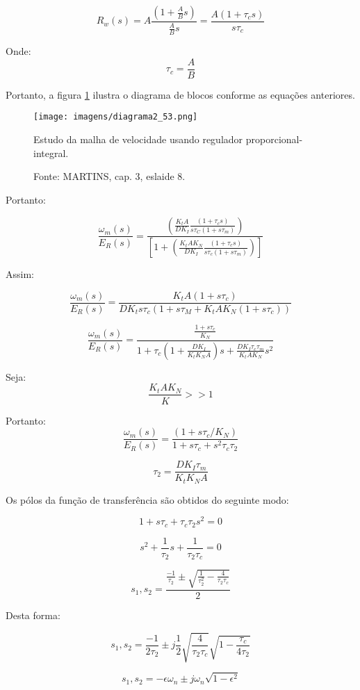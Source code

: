 \[R_{w}(s) = A \frac{\left(1 + \frac{A}{B}s\right)}{\frac{A}{B}s} = \frac{A\left(1 + \tau_{c}s\right)}{s\tau_{c}}\]

Onde:
\[\tau_{c} = \frac{A}{B}\]

Portanto, a figura \ref{fig:D2_53} ilustra o diagrama de blocos conforme as equações anteriores.

\begin{figure}[ht!]
\center
\texttt{[image: imagens/diagrama2\_53.png]}
\caption{\label{fig:D2_53} Estudo da malha de velocidade usando regulador proporcional-integral.}
\caption*{Fonte: MARTINS, cap. 3, eslaide 8.}
\end{figure}

Portanto:

\[\frac{\omega_{m}(s)}{E_{R}(s) } =  \frac{\left(\frac{K_{t}A}{DK_{I}}\frac{\left(1 + \tau_{c}s\right)}{s\tau_{C}\left(1 + s\tau_{m}\right)}\right)}{\left[1 + \left(\frac{K_{t}AK_{N}}{DK_{I}}\frac{\left(1 + \tau_{c}s\right)}{s\tau_{c}\left(1 + s\tau_{m}\right)}\right)\right]}\]

Assim:
 
\[\frac{\omega_{m}(s)}{E_{R}(s) } = \frac{K_{t}A\left(1 + s\tau_{c}\right)}{DK_{t}s\tau_{c}\left(1 + s\tau_{M} + K_{t}AK_{N}\left(1 + s\tau_{c}\right)\right)}\]

\[\frac{\omega_{m}(s)}{E_{R}(s) } = \frac{\frac{1 + s\tau_{c}}{K_{N}}}{1 + \tau_{c}\left(1 + \frac{DK_{I}}{K_{t}K_{N}A}\right)s + \frac{DK_{I}\tau_{c}\tau_{m}}{K_{t}AK_{N}}s^{2} }\]

Seja:
\[\frac{K_{t}AK_{N}}{K} >> 1\]

Portanto:
\[\frac{\omega_{m}(s)}{E_{R}(s) } = \frac{\left(1 + s\tau_{c}/K_{N}\right)}{1 + s\tau_{c} + s^{2}\tau_{c}\tau_{2}}\]

\[ \tau_{2} = \frac{DK_{I}\tau_{m}}{K_{t}K_{N}A}\]

Os pólos da função de transferência são obtidos do seguinte modo:

\[1 + s\tau_{c} + \tau_{c}\tau_{2}s^{2} = 0\]

\[ s^{2} + \frac{1}{\tau_{2}}s + \frac{1}{\tau_{2}\tau_{c}} = 0\]

\[s_{1},s_{2} = \frac{\frac{-1}{\tau_{2}} \pm \sqrt{\frac{1}{\tau_{2}^{2}} - \frac{4}{\tau_{2}\tau_{c}}}}{2}\]

Desta forma:

\[s_{1},s_{2} = \frac{-1}{2\tau_{2}} \pm j\frac{1}{2}\sqrt{\frac{4}{\tau_{2}\tau_{c}}}\sqrt{1 - \frac{\tau_{c}}{4\tau_{2}}}\]

\[s_{1},s_{2} = -\epsilon\omega_{n} \pm j\omega_{n}\sqrt{1 - \epsilon^{2}}\]

